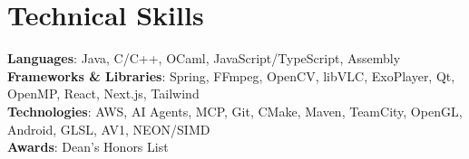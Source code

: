 \documentclass[letterpaper,11pt]{article}
\begin{document}
    \section{Technical Skills}
    \begin{itemize}[leftmargin=0.15in, label={}]
    \small{\item{
        \textbf{Languages}{: Java, C/C++, OCaml, JavaScript/TypeScript, Assembly} \\
        \textbf{Frameworks \& Libraries}{: Spring, FFmpeg, OpenCV, libVLC, ExoPlayer, Qt, OpenMP, React, Next.js, Tailwind} \\
        \textbf{Technologies}{: AWS, AI Agents, MCP, Git, CMake, Maven, TeamCity, OpenGL, Android, GLSL, AV1, NEON/SIMD} \\
        \textbf{Awards}{: Dean's Honors List}
    }}
    \end{itemize}
\end{document}
